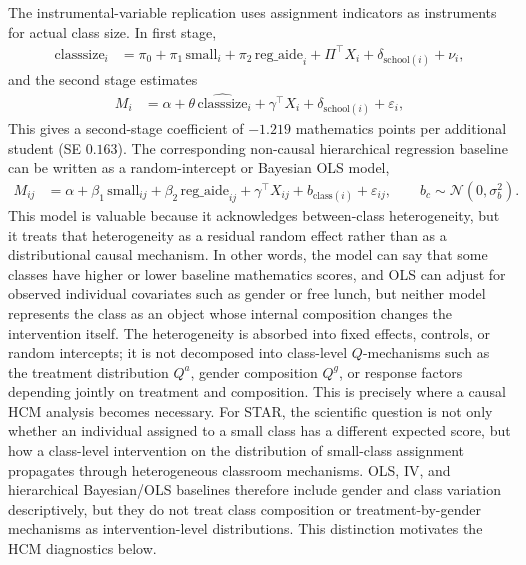 \documentclass[unnumsec,webpdf,contemporary,large]{oup-authoring-template}%
\theoremstyle{thmstyleone}%
\theoremstyle{thmstyletwo}%
\theoremstyle{thmstylethree}%
\begin{document}
The instrumental-variable replication uses assignment indicators as instruments for actual class size. In first stage,
\begin{align}
  \mathrm{classsize}_i
  &=
  \pi_0
  + \pi_1\,\mathrm{small}_i
  + \pi_2\,\mathrm{reg\_aide}_i
  + \Pi^\top X_i
  + \delta_{\mathrm{school}(i)}
  + \nu_i ,
  \label{eq:first-stage}
\end{align}
and the second stage estimates
\begin{align}
  M_i
  &=
  \alpha
  + \theta\,\widehat{\mathrm{classsize}}_i
  + \gamma^\top X_i
  + \delta_{\mathrm{school}(i)}
  + \varepsilon_i,
  \label{eq:second-stage}
\end{align}
This gives a second-stage coefficient of $-1.219$ mathematics points per additional student (SE $0.163$).
The corresponding non-causal hierarchical regression baseline can be written as a random-intercept or Bayesian OLS model,
\begin{align}
  M_{ij}
  &=
  \alpha
  + \beta_1\,\mathrm{small}_{ij}
  + \beta_2\,\mathrm{reg\_aide}_{ij}
  + \gamma^\top X_{ij}
  + b_{\mathrm{class}(i)}
  + \varepsilon_{ij},
  \qquad
  b_c \sim \mathcal{N}(0,\sigma_b^2).
  \label{eq:hierarchical-baseline}
\end{align}
This model is valuable because it acknowledges between-class heterogeneity, but it treats that heterogeneity as a residual random effect rather than as a distributional causal mechanism.
In other words, the model can say that some classes have higher or lower baseline mathematics scores, and OLS can adjust for observed individual covariates such as gender or free lunch, but neither model represents the class as an object whose internal composition changes the intervention itself.
The heterogeneity is absorbed into fixed effects, controls, or random intercepts; it is not decomposed into class-level $Q$-mechanisms such as the treatment distribution $Q^a$, gender composition $Q^g$, or response factors depending jointly on treatment and composition.
This is precisely where a causal HCM analysis becomes necessary.
For STAR, the scientific question is not only whether an individual assigned to a small class has a different expected score, but how a class-level intervention on the distribution of small-class assignment propagates through heterogeneous classroom mechanisms.
OLS, IV, and hierarchical Bayesian/OLS baselines therefore include gender and class variation descriptively, but they do not treat class composition or treatment-by-gender mechanisms as intervention-level distributions.
This distinction motivates the HCM diagnostics below.
\end{document}
